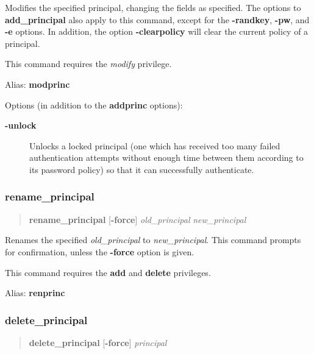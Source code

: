 \documentclass[letterpaper,10pt,english]{sphinxmanual}
\begin{document}
Modifies the specified principal, changing the fields as specified.
The options to \textbf{add\_principal} also apply to this command, except
for the \textbf{-randkey}, \textbf{-pw}, and \textbf{-e} options.  In addition, the
option \textbf{-clearpolicy} will clear the current policy of a principal.

This command requires the \emph{modify} privilege.

Alias: \textbf{modprinc}

Options (in addition to the \textbf{addprinc} options):
\begin{description}
\item[{\textbf{-unlock}}] \leavevmode
Unlocks a locked principal (one which has received too many failed
authentication attempts without enough time between them according
to its password policy) so that it can successfully authenticate.

\end{description}
\label{admin/admin_commands/kadmin_local:modify-principal-end}

\subsubsection{rename\_principal}
\label{admin/admin_commands/kadmin_local:modify-principal-end}\label{admin/admin_commands/kadmin_local:rename-principal}\label{admin/admin_commands/kadmin_local:id3}\begin{quote}

\textbf{rename\_principal} {[}\textbf{-force}{]} \emph{old\_principal} \emph{new\_principal}
\end{quote}

Renames the specified \emph{old\_principal} to \emph{new\_principal}.  This
command prompts for confirmation, unless the \textbf{-force} option is
given.

This command requires the \textbf{add} and \textbf{delete} privileges.

Alias: \textbf{renprinc}
\label{admin/admin_commands/kadmin_local:rename-principal-end}

\subsubsection{delete\_principal}
\label{admin/admin_commands/kadmin_local:id4}\label{admin/admin_commands/kadmin_local:delete-principal}\label{admin/admin_commands/kadmin_local:rename-principal-end}\begin{quote}

\textbf{delete\_principal} {[}\textbf{-force}{]} \emph{principal}
\end{quote}
\end{document}
